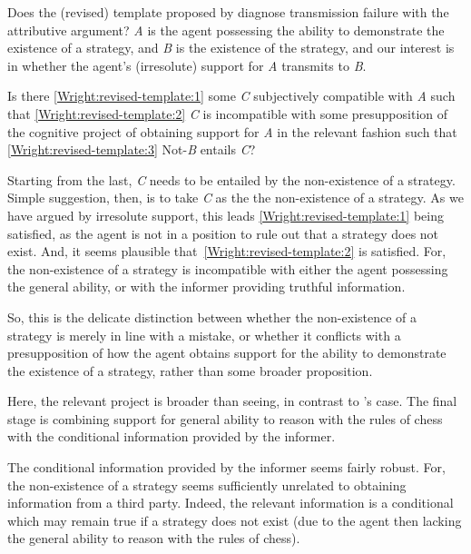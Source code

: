 \documentclass[10pt]{article}
\begin{document}
\begin{note}
  Does the (revised) template proposed by \citeauthor{Wright:2011wn} diagnose transmission failure with the attributive argument?
  \emph{A} is the agent possessing the ability to demonstrate the existence of a strategy, and \emph{B} is the existence of the strategy, and our interest is in whether the agent's (irresolute) support for \emph{A} transmits to \emph{B}.

  Is there \ref{Wright:revised-template:1} some \emph{C} subjectively compatible with \emph{A} such that \ref{Wright:revised-template:2} \emph{C} is incompatible with some presupposition of the cognitive project of obtaining support for \emph{A} in the relevant fashion  such that \ref{Wright:revised-template:3} Not-\emph{B} entails \emph{C}?

  Starting from the last, \emph{C} needs to be entailed by the non-existence of a strategy.
  Simple suggestion, then, is to take \emph{C} as the the non-existence of a strategy.
  As we have argued by irresolute support, this leads \ref{Wright:revised-template:1} being satisfied, as the agent is not in a position to rule out that a strategy does not exist.
  And, it seems plausible that~\ref{Wright:revised-template:2} is satisfied.
  For, the non-existence of a strategy is incompatible with either the agent possessing the general ability, or with the informer providing truthful information.

  So, this is the delicate distinction between whether the non-existence of a strategy is merely in line with a mistake, or whether it conflicts with a presupposition of how the agent obtains support for the ability to demonstrate the existence of a strategy, rather than some broader proposition.

  Here, the relevant project is broader than seeing, in contrast to \citeauthor{Dretske:2005vy}'s case.
  The final stage is combining support for general ability to reason with the rules of chess with the conditional information provided by the informer.

  The conditional information provided by the informer seems fairly robust.
  For, the non-existence of a strategy seems sufficiently unrelated to obtaining information from a third party.
  Indeed, the relevant information is a conditional which may remain true if a strategy does not exist (due to the agent then lacking the general ability to reason with the rules of chess).


\end{note}
\end{document}
